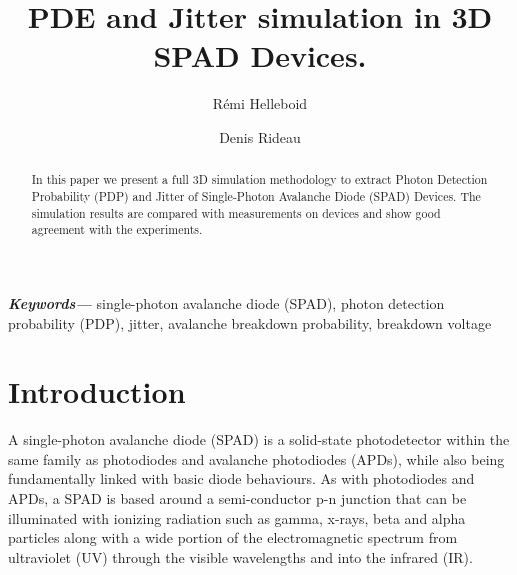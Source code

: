 \documentclass[12pt,a4paper,twocolumn]{article}
\title{PDE and Jitter simulation in 3D SPAD Devices.}
\author[1]{Rémi Helleboid}
\author[1]{Denis Rideau}
\affil[1]{ST Microelectronics, Crolles, France}
\date{}                     %
\providecommand{\keywords}[1]
{
  \small	
  \textbf{\textit{Keywords---}} #1
}
\begin{document}
\maketitle

\begin{abstract}
In this paper we present a full 3D simulation methodology to extract Photon Detection Probability (PDP) and Jitter of Single-Photon Avalanche Diode (SPAD) Devices. The simulation results are compared with measurements on devices and show good agreement with the experiments.\\
\end{abstract}

\keywords{single-photon avalanche diode (SPAD), photon detection probability (PDP), jitter, avalanche breakdown probability, breakdown voltage}

\section{Introduction}
A single-photon avalanche diode (SPAD) is a solid-state photodetector within the same family as photodiodes and avalanche photodiodes (APDs), while also being fundamentally linked with basic diode behaviours. As with photodiodes and APDs, a SPAD is based around a semi-conductor p-n junction that can be illuminated with ionizing radiation such as gamma, x-rays, beta and alpha particles along with a wide portion of the electromagnetic spectrum from ultraviolet (UV) through the visible wavelengths and into the infrared (IR). 
\end{document}
